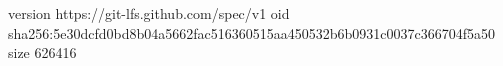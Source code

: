 version https://git-lfs.github.com/spec/v1
oid sha256:5e30dcfd0bd8b04a5662fac516360515aa450532b6b0931c0037c366704f5a50
size 626416
